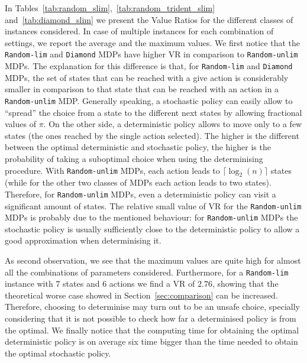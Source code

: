 In Tables~\ref{tab:random_slim},~\ref{tab:random_trident_slim} and~\ref{tab:diamond_slim} we present the Value Ratios for the different classes of instances considered. In case of multiple instances for each combination of settings, we report the average and the maximum values.
%
We first notice that the \texttt{Random-lim} and \texttt{Diamond} MDPs have higher VR in comparison to \texttt{Random-unlim} MDPs. The explanation for this difference is that, for \texttt{Random-lim} and \texttt{Diamond} MDPs, the set of states that can be reached with a give action is considerably smaller in comparison to that state that can be reached with an action in a \texttt{Random-unlim} MDP. 
%
Generally speaking, a stochastic policy can easily allow to ``spread'' the choice from a state to the different next states by allowing fractional values of $\pi$.
On the other side, a deterministic policy allows to move only to a few states (the ones reached by the single action selected). The higher is the different between the optimal deterministic and stochastic policy, the higher is the probability of taking a suboptimal choice when using the determinising procedure.
%
With \texttt{Random-unlim} MDPs, each action leads to  $\lceil \log_2(n) \rceil$ states (while for the other two classes of MDPs each action leads to two states). Therefore, for \texttt{Random-unlim} MDPs, even a deterministic policy can visit a significant amount of states.
%
The relative small value of VR for the \texttt{Random-unlim} MDPs is probably due to the mentioned behaviour: for \texttt{Random-unlim} MDPs the stochastic policy is usually sufficiently close to the deterministic policy to allow a good approximation when determinising it. 

%

As second observation, we see that the maximum values are quite high for almost all the combinations of parameters considered. Furthermore, for a \texttt{Random-lim} instance with $7$ states and $6$ actions we find a VR of $2.76$, showing that the theoretical worse case showed in Section~\ref{sec:comparison} can be increased. 
%
Therefore, choosing to determinise may turn out to be an unsafe choice, specially considering that it is not possible to check how far a determinised policy is from the optimal. We finally notice that the computing time for obtaining the optimal deterministic policy is on average six time bigger than the time needed to obtain the optimal stochastic policy.  

